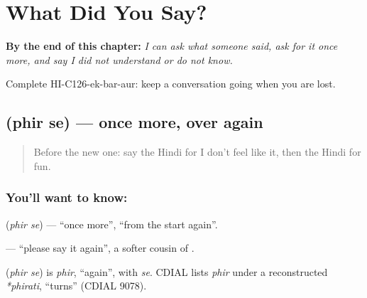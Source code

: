 
\chapter{What Did You Say?}
\label{ch:hi-what-did-you-say}

\begin{chapteropening}
\textbf{By the end of this chapter:} \emph{I can ask what someone said, ask for it once more, and say I did not understand or do not know.}

Complete HI-C126-ek-bar-aur: keep a conversation going when you are lost.
\end{chapteropening}

\section[\texorpdfstring{\hi{फिर} \hi{से} (phir se)}{फिर से (phir se)}]{  (phir se) — once more, over again}

\label{lesson:HI-C126-phirse}



\begin{quote}
Before the new one: say the Hindi for I don't feel like it, then the Hindi for fun.
\end{quote}

\subsection*{You'll want to know:  }
\textbf{ } (\emph{phir se}) — \textquotedblleft{}once more\textquotedblright{}, \textquotedblleft{}from the start again\textquotedblright{}.

\textbf{  } — \textquotedblleft{}please say it again\textquotedblright{}, a softer cousin of \textbf{}.

\begin{cousinweb}
\textbf{ } (\emph{phir se}) is \emph{phir}, \textquotedblleft{}again\textquotedblright{}, with \emph{se}. CDIAL lists \emph{phir} under a reconstructed \emph{*phirati}, \textquotedblleft{}turns\textquotedblright{} (CDIAL 9078).
\end{cousinweb}

